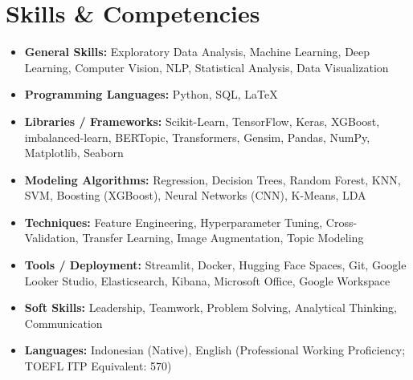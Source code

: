 \documentclass[letterpaper,10pt]{article}
\newcommand{\resumeItem}[1]{\item\small{#1}}
\newcommand{\resumeSubHeadingList}{\begin{itemize}[leftmargin=0.15in, label={}]}
\newcommand{\resumeSubHeadingListEnd}{\end{itemize}}
\begin{document}
\section{Skills \& Competencies}
\resumeSubHeadingList
  \resumeItem{\textbf{General Skills:} Exploratory Data Analysis, Machine Learning, Deep Learning, Computer Vision, NLP, Statistical Analysis, Data Visualization}
  \resumeItem{\textbf{Programming Languages:} Python, SQL, LaTeX}
  \resumeItem{\textbf{Libraries / Frameworks:} Scikit-Learn, TensorFlow, Keras, XGBoost, imbalanced-learn, BERTopic, Transformers, Gensim, Pandas, NumPy, Matplotlib, Seaborn}
  \resumeItem{\textbf{Modeling Algorithms:} Regression, Decision Trees, Random Forest, KNN, SVM, Boosting (XGBoost), Neural Networks (CNN), K-Means, LDA}
  \resumeItem{\textbf{Techniques:} Feature Engineering, Hyperparameter Tuning, Cross-Validation, Transfer Learning, Image Augmentation, Topic Modeling}
  \resumeItem{\textbf{Tools / Deployment:} Streamlit, Docker, Hugging Face Spaces, Git, Google Looker Studio, Elasticsearch, Kibana, Microsoft Office, Google Workspace}
  \resumeItem{\textbf{Soft Skills:} Leadership, Teamwork, Problem Solving, Analytical Thinking, Communication}
  \resumeItem{\textbf{Languages:} Indonesian (Native), English (Professional Working Proficiency; TOEFL ITP Equivalent: 570)}
\resumeSubHeadingListEnd

\end{document}
